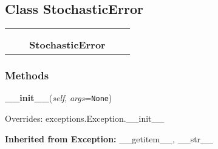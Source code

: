 

\subsection{Class StochasticError}

    \label{stochastic:StochasticError}
\begin{tabular}{cccccc}
\multicolumn{2}{r}{\settowidth{\BCL}{exceptions.Exception}\multirow{2}{\BCL}{exceptions.Exception}}
&&
  \\\cline{3-3}
  &&\multicolumn{1}{c|}{}
&&
  \\
&&\multicolumn{2}{l}{\textbf{StochasticError}}
\end{tabular}



  \subsubsection{Methods}

    \label{stochastic:StochasticError:__init__}
    \vspace{0.5ex}

    \begin{boxedminipage}{\textwidth}

    \raggedright \textbf{\_\_init\_\_}(\textit{self}, \textit{args}=\texttt{N\-o\-n\-e\-})

      Overrides: exceptions.Exception.\_\_init\_\_

    \end{boxedminipage}

  \textbf{Inherited from Exception:}
    \_\_getitem\_\_,
    \_\_str\_\_

